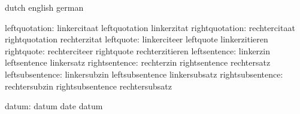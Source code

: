 
\startconstants       dutch                english             german

      leftquotation:  linkercitaat         leftquotation       linkerzitat
     rightquotation:  rechtercitaat        rightquotation      rechterzitat
          leftquote:  linkerciteer         leftquote           linkerzitieren
         rightquote:  rechterciteer        rightquote          rechterzitieren
       leftsentence:  linkerzin            leftsentence        linkersatz
      rightsentence:  rechterzin           rightsentence       rechtersatz
    leftsubsentence:  linkersubzin         leftsubsentence     linkersubsatz
   rightsubsentence:  rechtersubzin        rightsubsentence    rechtersubsatz

              datum:  datum                date                datum

